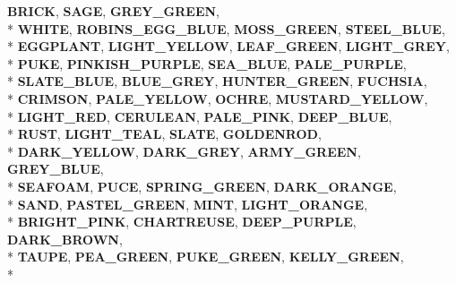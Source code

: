 \begin{DoxyCompactItemize}
{\bfseries B\+R\+I\+CK}, 
{\bfseries S\+A\+GE}, 
{\bfseries G\+R\+E\+Y\+\_\+\+G\+R\+E\+EN}, 
\\*
{\bfseries W\+H\+I\+TE}, 
{\bfseries R\+O\+B\+I\+N\+S\+\_\+\+E\+G\+G\+\_\+\+B\+L\+UE}, 
{\bfseries M\+O\+S\+S\+\_\+\+G\+R\+E\+EN}, 
{\bfseries S\+T\+E\+E\+L\+\_\+\+B\+L\+UE}, 
\\*
{\bfseries E\+G\+G\+P\+L\+A\+NT}, 
{\bfseries L\+I\+G\+H\+T\+\_\+\+Y\+E\+L\+L\+OW}, 
{\bfseries L\+E\+A\+F\+\_\+\+G\+R\+E\+EN}, 
{\bfseries L\+I\+G\+H\+T\+\_\+\+G\+R\+EY}, 
\\*
{\bfseries P\+U\+KE}, 
{\bfseries P\+I\+N\+K\+I\+S\+H\+\_\+\+P\+U\+R\+P\+LE}, 
{\bfseries S\+E\+A\+\_\+\+B\+L\+UE}, 
{\bfseries P\+A\+L\+E\+\_\+\+P\+U\+R\+P\+LE}, 
\\*
{\bfseries S\+L\+A\+T\+E\+\_\+\+B\+L\+UE}, 
{\bfseries B\+L\+U\+E\+\_\+\+G\+R\+EY}, 
{\bfseries H\+U\+N\+T\+E\+R\+\_\+\+G\+R\+E\+EN}, 
{\bfseries F\+U\+C\+H\+S\+IA}, 
\\*
{\bfseries C\+R\+I\+M\+S\+ON}, 
{\bfseries P\+A\+L\+E\+\_\+\+Y\+E\+L\+L\+OW}, 
{\bfseries O\+C\+H\+RE}, 
{\bfseries M\+U\+S\+T\+A\+R\+D\+\_\+\+Y\+E\+L\+L\+OW}, 
\\*
{\bfseries L\+I\+G\+H\+T\+\_\+\+R\+ED}, 
{\bfseries C\+E\+R\+U\+L\+E\+AN}, 
{\bfseries P\+A\+L\+E\+\_\+\+P\+I\+NK}, 
{\bfseries D\+E\+E\+P\+\_\+\+B\+L\+UE}, 
\\*
{\bfseries R\+U\+ST}, 
{\bfseries L\+I\+G\+H\+T\+\_\+\+T\+E\+AL}, 
{\bfseries S\+L\+A\+TE}, 
{\bfseries G\+O\+L\+D\+E\+N\+R\+OD}, 
\\*
{\bfseries D\+A\+R\+K\+\_\+\+Y\+E\+L\+L\+OW}, 
{\bfseries D\+A\+R\+K\+\_\+\+G\+R\+EY}, 
{\bfseries A\+R\+M\+Y\+\_\+\+G\+R\+E\+EN}, 
{\bfseries G\+R\+E\+Y\+\_\+\+B\+L\+UE}, 
\\*
{\bfseries S\+E\+A\+F\+O\+AM}, 
{\bfseries P\+U\+CE}, 
{\bfseries S\+P\+R\+I\+N\+G\+\_\+\+G\+R\+E\+EN}, 
{\bfseries D\+A\+R\+K\+\_\+\+O\+R\+A\+N\+GE}, 
\\*
{\bfseries S\+A\+ND}, 
{\bfseries P\+A\+S\+T\+E\+L\+\_\+\+G\+R\+E\+EN}, 
{\bfseries M\+I\+NT}, 
{\bfseries L\+I\+G\+H\+T\+\_\+\+O\+R\+A\+N\+GE}, 
\\*
{\bfseries B\+R\+I\+G\+H\+T\+\_\+\+P\+I\+NK}, 
{\bfseries C\+H\+A\+R\+T\+R\+E\+U\+SE}, 
{\bfseries D\+E\+E\+P\+\_\+\+P\+U\+R\+P\+LE}, 
{\bfseries D\+A\+R\+K\+\_\+\+B\+R\+O\+WN}, 
\\*
{\bfseries T\+A\+U\+PE}, 
{\bfseries P\+E\+A\+\_\+\+G\+R\+E\+EN}, 
{\bfseries P\+U\+K\+E\+\_\+\+G\+R\+E\+EN}, 
{\bfseries K\+E\+L\+L\+Y\+\_\+\+G\+R\+E\+EN}, 
\\*

\end{DoxyCompactItemize}
